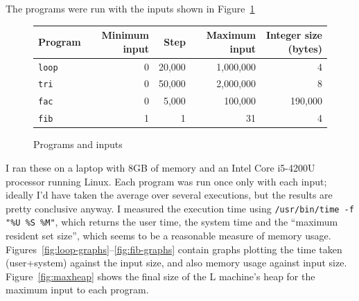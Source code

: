 \documentclass[a4paper]{article}
\begin{document}
\noindent The programs were run with the inputs shown in Figure~\ref{fig:benchmark-inputs}

\begin{figure}[H]
\centering
\begin{tabular}{|l|r|r|r|r|} 
\hline
Program   & Minimum input & Step & Maximum input & Integer size (bytes) \\
\hline
\texttt{loop} & 0 & 20,000 & 1,000,000 & 4\\
\texttt{tri}  & 0 & 50,000 & 2,000,000 & 8\\
\texttt{fac}  & 0 & 5,000 & 100,000 & 190,000\\
\texttt{fib}  & 1 & 1 & 31 & 4 \\
\hline
\end{tabular}
\caption{Programs and inputs}\label{fig:benchmark-inputs}
\end{figure}

\noindent
I ran these on a laptop with 8GB of memory and an Intel Core i5-4200U
processor running Linux.  Each program was run once only with each
input; ideally I'd have taken the average over several executions, but
the results are pretty conclusive anyway.  I measured the execution
time using \texttt{/usr/bin/time -f "\%U \%S \%M"}, which returns the
user time, the system time and the ``maximum resident set size'',
which seems to be a reasonable measure of memory usage.
Figures~\ref{fig:loop-graphs}--\ref{fig:fib-graphs} contain graphs
plotting the time taken (user+system) against the input size, and also
memory usage against input size.  Figure~\ref{fig:maxheap} shows the
final size of the L machine's heap for the maximum input to each
program.
\end{document}
